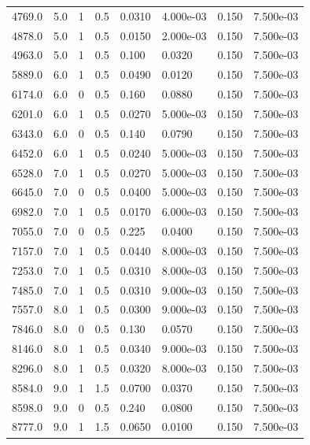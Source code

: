 \documentclass[preview]{standalone}
\begin{document}
{{\begin{tabular}{L{1.2cm}C{1.2cm} C{0.3cm}C{0.5cm} C{1.4cm}C{1.4cm} C{1.4cm}C{1.4cm}}
  4769.0  &   5.0  & 1     & 0.5 &  0.0310  & 4.000e-03  & 0.150 &  7.500e-03   \\ 
  4878.0  &   5.0  & 1     & 0.5 &  0.0150  & 2.000e-03  & 0.150 &  7.500e-03   \\ 
  4963.0  &   5.0  & 1     & 0.5 &  0.100  & 0.0320  & 0.150 &  7.500e-03   \\ 
  5889.0  &   6.0  & 1     & 0.5 &  0.0490  & 0.0120  & 0.150 &  7.500e-03   \\ 
  6174.0  &   6.0  & 0     & 0.5 &  0.160  & 0.0880  & 0.150 &  7.500e-03   \\ 
  6201.0  &   6.0  & 1     & 0.5 &  0.0270  & 5.000e-03  & 0.150 &  7.500e-03   \\ 
  6343.0  &   6.0  & 0     & 0.5 &  0.140  & 0.0790  & 0.150 &  7.500e-03   \\ 
  6452.0  &   6.0  & 1     & 0.5 &  0.0240  & 5.000e-03  & 0.150 &  7.500e-03   \\ 
  6528.0  &   7.0  & 1     & 0.5 &  0.0270  & 5.000e-03  & 0.150 &  7.500e-03   \\ 
  6645.0  &   7.0  & 0     & 0.5 &  0.0400  & 5.000e-03  & 0.150 &  7.500e-03   \\ 
  6982.0  &   7.0  & 1     & 0.5 &  0.0170  & 6.000e-03  & 0.150 &  7.500e-03   \\ 
  7055.0  &   7.0  & 0     & 0.5 &  0.225  & 0.0400  & 0.150 &  7.500e-03   \\ 
  7157.0  &   7.0  & 1     & 0.5 &  0.0440  & 8.000e-03  & 0.150 &  7.500e-03   \\ 
  7253.0  &   7.0  & 1     & 0.5 &  0.0310  & 8.000e-03  & 0.150 &  7.500e-03   \\ 
  7485.0  &   7.0  & 1     & 0.5 &  0.0310  & 9.000e-03  & 0.150 &  7.500e-03   \\ 
  7557.0  &   8.0  & 1     & 0.5 &  0.0300  & 9.000e-03  & 0.150 &  7.500e-03   \\ 
  7846.0  &   8.0  & 0     & 0.5 &  0.130  & 0.0570  & 0.150 &  7.500e-03   \\ 
  8146.0  &   8.0  & 1     & 0.5 &  0.0340  & 9.000e-03  & 0.150 &  7.500e-03   \\ 
  8296.0  &   8.0  & 1     & 0.5 &  0.0320  & 8.000e-03  & 0.150 &  7.500e-03   \\ 
  8584.0  &   9.0  & 1     & 1.5 &  0.0700  & 0.0370  & 0.150 &  7.500e-03   \\ 
  8598.0  &   9.0  & 0     & 0.5 &  0.240  & 0.0800  & 0.150 &  7.500e-03   \\ 
  8777.0  &   9.0  & 1     & 1.5 &  0.0650  & 0.0100  & 0.150 &  7.500e-03   \\ 

\end{tabular}}}
\end{document}
